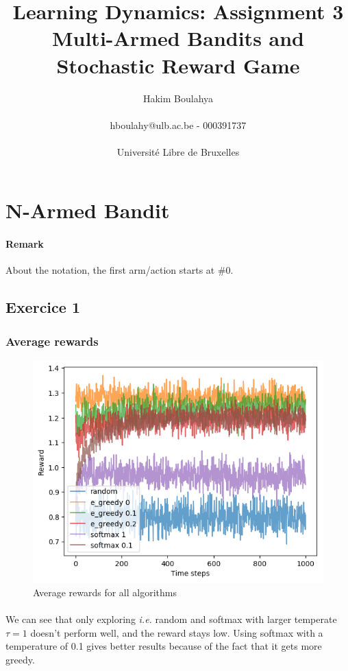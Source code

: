 \documentclass[letterpaper]{article}
\title{
\LARGE Learning Dynamics: Assignment 3 \\
\Large Multi-Armed Bandits and Stochastic Reward Game}
\author{\Large Hakim Boulahya \\ \\
hboulahy@ulb.ac.be - 000391737 \\ \\
\large Université Libre de Bruxelles \\
}
\begin{document}
\maketitle
\tableofcontents
\newpage

\section{N-Armed Bandit}

\paragraph{Remark} About the notation, the first arm/action starts
at \#0.

\subsection{Exercice 1}

\subsubsection{Average rewards}


\begin{figure}[H]
    \centering
    \includegraphics[width=.7\linewidth]{images/assign3/ex1/rewards}
    \caption{Average rewards for all algorithms}
    \label{fig:rewards_ex1}
\end{figure}

\paragraph{}

We can see that only exploring \textit{i.e.} random
and softmax with larger temperate $\tau = 1$ doesn't perform well, and
the reward stays low. Using softmax
with a temperature of 0.1 gives better results because
of the fact that it gets more greedy.
\end{document}

